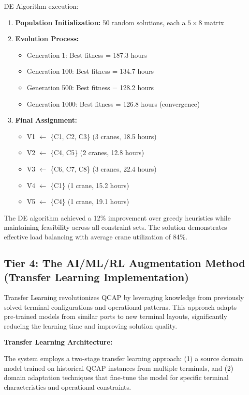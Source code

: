 \documentclass{article}
\begin{document}
DE Algorithm execution:
\begin{enumerate}
\item \textbf{Population Initialization:} 50 random solutions, each a $5 \times 8$ matrix
\item \textbf{Evolution Process:} 
   \begin{itemize}
   \item Generation 1: Best fitness = 187.3 hours
   \item Generation 100: Best fitness = 134.7 hours  
   \item Generation 500: Best fitness = 128.2 hours
   \item Generation 1000: Best fitness = 126.8 hours (convergence)
   \end{itemize}
\item \textbf{Final Assignment:}
   \begin{itemize}
   \item V1 $\leftarrow$ \{C1, C2, C3\} (3 cranes, 18.5 hours)
   \item V2 $\leftarrow$ \{C4, C5\} (2 cranes, 12.8 hours)
   \item V3 $\leftarrow$ \{C6, C7, C8\} (3 cranes, 22.4 hours)
   \item V4 $\leftarrow$ \{C1\} (1 crane, 15.2 hours)
   \item V5 $\leftarrow$ \{C4\} (1 crane, 19.1 hours)
   \end{itemize}
\end{enumerate}

The DE algorithm achieved a 12\% improvement over greedy heuristics while maintaining feasibility across all constraint sets. The solution demonstrates effective load balancing with average crane utilization of 84\%.

\subsection{Tier 4: The AI/ML/RL Augmentation Method (Transfer Learning Implementation)}

Transfer Learning revolutionizes QCAP by leveraging knowledge from previously solved terminal configurations and operational patterns. This approach adapts pre-trained models from similar ports to new terminal layouts, significantly reducing the learning time and improving solution quality.

\textbf{Transfer Learning Architecture:}

The system employs a two-stage transfer learning approach: (1) a source domain model trained on historical QCAP instances from multiple terminals, and (2) domain adaptation techniques that fine-tune the model for specific terminal characteristics and operational constraints.
\end{document}
